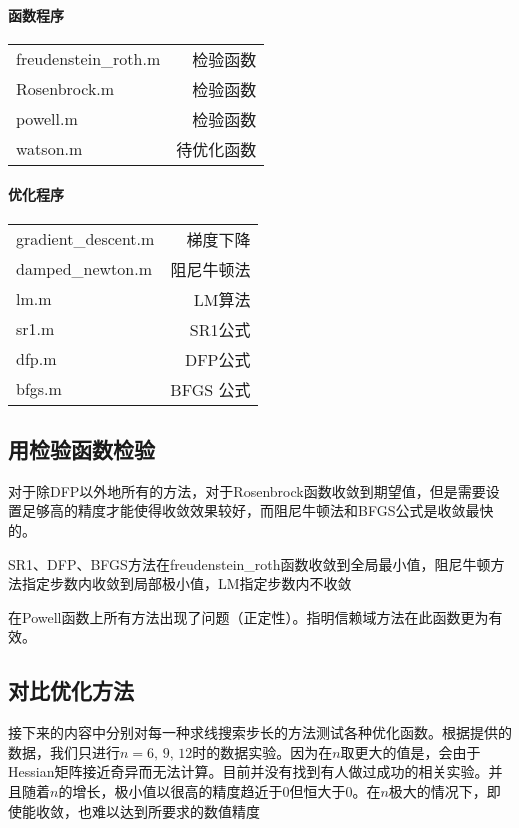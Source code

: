 \documentclass[11pt, a4paper]{article}
\begin{document}
\paragraph{函数程序}

\begin{tabular}{|l|r|}
	\hline
	freudenstein\_roth.m & 检验函数\\
	Rosenbrock.m & 检验函数\\
	powell.m & 检验函数\\
	watson.m & 待优化函数\\\hline
\end{tabular}

\paragraph{优化程序}

\begin{tabular}{|l|r|}
	\hline
	gradient\_descent.m & 梯度下降\\
	damped\_newton.m & 阻尼牛顿法\\
	lm.m & LM算法\\
	sr1.m & SR1公式\\
	dfp.m & DFP公式\\
	bfgs.m & BFGS 公式\\\hline
\end{tabular}

\subsection{用检验函数检验}

对于除DFP以外地所有的方法，对于Rosenbrock函数收敛到期望值，但是需要设置足够高的精度才能使得收敛效果较好，而阻尼牛顿法和BFGS公式是收敛最快的。

SR1、DFP、BFGS方法在freudenstein\_roth函数收敛到全局最小值，阻尼牛顿方法指定步数内收敛到局部极小值，LM指定步数内不收敛

在Powell函数上所有方法出现了问题（正定性）。\cite{Byrd1988}指明信赖域方法在此函数更为有效。

\subsection{对比优化方法}

接下来的内容中分别对每一种求线搜索步长的方法测试各种优化函数。根据\cite{More:1981:TUO:355934.355936}提供的数据，我们只进行$n=6,\,9,\,12$时的数据实验。因为在$n$取更大的值是，会由于Hessian矩阵接近奇异而无法计算。目前并没有找到有人做过成功的相关实验。并且随着$n$的增长，极小值以很高的精度趋近于0但恒大于0。在$n$极大的情况下，即使能收敛，也难以达到所要求的数值精度
\end{document}
